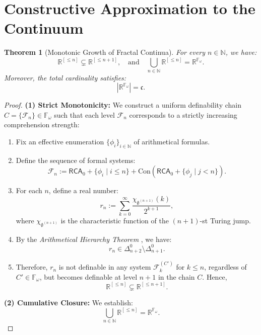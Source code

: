 \documentclass[12pt]{article}
\theoremstyle{definition}
\theoremstyle{plain}
\newtheorem{theorem}[definition]{Theorem}
\theoremstyle{remark}
\begin{document}
\section{Constructive Approximation to the Continuum}

\begin{theorem}[Monotonic Growth of Fractal Continua]
\label{thm:monotonic-growth}
For every \( n \in \mathbb{N} \), we have:
\[
\mathbb{R}^{[\leq n]} \subsetneq \mathbb{R}^{[\leq n+1]}, \quad \text{and} \quad \bigcup_{n\in\mathbb{N}} \mathbb{R}^{[\leq n]} = \mathbb{R}^{\mathbb{F}_\omega}.
\]
Moreover, the total cardinality satisfies:
\[
|\mathbb{R}^{\mathbb{F}_\omega}| = \mathfrak{c}.
\]
\end{theorem}

\begin{proof}
\textbf{(1) Strict Monotonicity:}  
We construct a uniform definability chain \( C = \{ \mathcal{F}_n \} \in \mathbb{F}_\omega \) such that each level \(\mathcal{F}_n\) corresponds to a strictly increasing comprehension strength:

\begin{enumerate}
\item Fix an effective enumeration \(\{ \phi_i \}_{i \in \mathbb{N}}\) of arithmetical formulas.

\item Define the sequence of formal systems:
\[
\mathcal{F}_n := \mathsf{RCA}_0 + \{\phi_i \mid i \leq n\} + \mathrm{Con}(\mathsf{RCA}_0 + \{\phi_j \mid j < n\}).
\]

\item For each \( n \), define a real number:
\[
r_n := \sum_{k=0}^\infty \frac{\chi_{\emptyset^{(n+1)}}(k)}{2^{k+1}},
\]
where \( \chi_{\emptyset^{(n+1)}} \) is the characteristic function of the \( (n+1) \)-st Turing jump.

\item By the \emph{Arithmetical Hierarchy Theorem} \cite[Thm~III.2.2]{Soare2016}, we have:
\[
r_n \in \Delta^0_{n+2} \setminus \Delta^0_{n+1}.
\]

\item Therefore, \( r_n \) is not definable in any system \( \mathcal{F}_k^{(C')} \) for \( k \leq n \), regardless of \( C' \in \mathbb{F}_\omega \), but becomes definable at level \( n+1 \) in the chain \( C \). Hence,
\[
\mathbb{R}^{[\leq n]} \subsetneq \mathbb{R}^{[\leq n+1]}.
\]
\end{enumerate}

\textbf{(2) Cumulative Closure:}  
We establish:
\[
\bigcup_{n \in \mathbb{N}} \mathbb{R}^{[\leq n]} = \mathbb{R}^{\mathbb{F}_\omega}.
\]


\end{proof}
\end{document}
